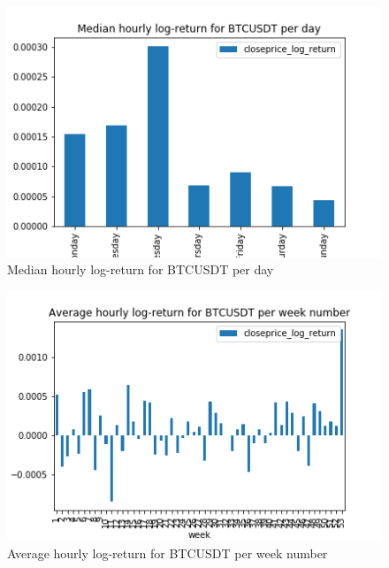 \documentclass[twoside]{report}
\begin{document}
\begin{spacing}{1}
\begin{figure}[!htbp]
    \centering
    \includegraphics[scale = 0.5]{Images/Median hourly log-return for BTCUSDT per day.png}
    \caption{Median hourly log-return for BTCUSDT per day}
    \label{Median hourly log-return for BTCUSDT per day}
\end{figure}

\begin{figure}[!htbp]
    \centering
    \includegraphics[scale = 0.5]{Images/Average hourly log-return for BTCUSDT per week number.png}
    \caption{Average hourly log-return for BTCUSDT per week number}
    \label{Average hourly log-return for BTCUSDT per week number}
\end{figure}


\end{spacing}
\end{document}
